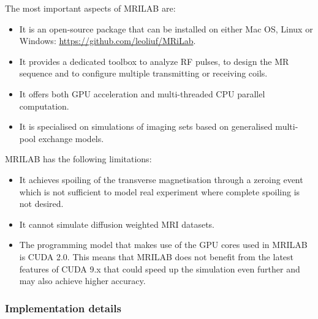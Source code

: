 The most important aspects of MRILAB are:
\begin{itemize}

    \item It is an open-source package that can be installed on either Mac OS, Linux or Windows: \url{https://github.com/leoliuf/MRiLab}.
    
    \item It provides a dedicated toolbox to analyze RF pulses, to design the MR sequence and to configure multiple transmitting or receiving coils.
    
    \item It offers both GPU acceleration and multi-threaded CPU parallel computation.
    
    
    \item It is specialised on simulations of imaging sets based on generalised multi-pool exchange models.
    
\end{itemize}

\hfill

MRILAB has the following limitations:
\begin{itemize}
    
    \item It achieves spoiling of the transverse magnetisation through a zeroing event which is not sufficient to model real experiment where complete spoiling is not desired.
    
    \item It cannot simulate diffusion weighted MRI datasets.
    
    \item The programming model that makes use of the GPU cores used in MRILAB is CUDA 2.0. This means that MRILAB does not benefit from the latest features of CUDA 9.x that could speed up the simulation even further and may also achieve higher accuracy.
    
\end{itemize}

\hfill

\subsubsection{Implementation details}

